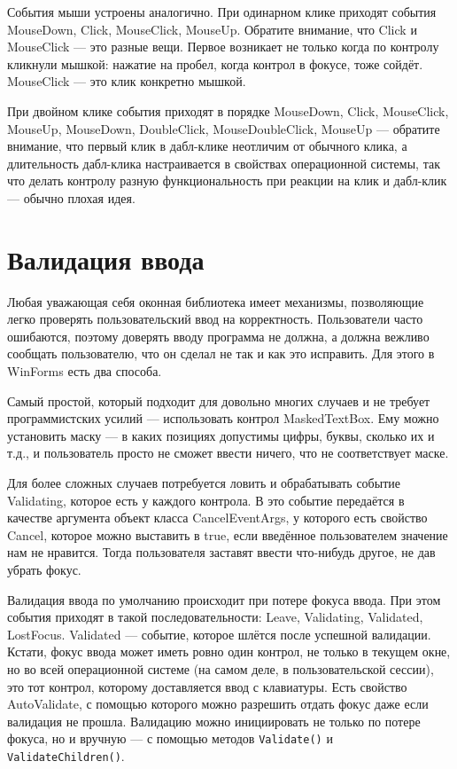 \documentclass{../../text-style}
\begin{document}
События мыши устроены аналогично. При одинарном клике приходят события MouseDown, Click, MouseClick, MouseUp. Обратите внимание, что Click и MouseClick --- это разные вещи. Первое возникает не только когда по контролу кликнули мышкой: нажатие на пробел, когда контрол в фокусе, тоже сойдёт. MouseClick --- это клик конкретно мышкой.

При двойном клике события приходят в порядке MouseDown, Click, MouseClick, MouseUp, MouseDown, DoubleClick, MouseDoubleClick, MouseUp --- обратите внимание, что первый клик в дабл-клике неотличим от обычного клика, а длительность дабл-клика настраивается в свойствах операционной системы, так что делать контролу разную функциональность при реакции на клик и дабл-клик --- обычно плохая идея.

\section{Валидация ввода}

Любая уважающая себя оконная библиотека имеет механизмы, позволяющие легко проверять пользовательский ввод на корректность. Пользователи часто ошибаются, поэтому доверять вводу программа не должна, а должна вежливо сообщать пользователю, что он сделал не так и как это исправить. Для этого в WinForms есть два способа. 

Самый простой, который подходит для  довольно многих случаев и не требует программистских усилий --- использовать контрол MaskedTextBox. Ему можно установить маску --- в каких позициях допустимы цифры, буквы, сколько их  и т.д., и пользователь просто не сможет ввести ничего, что не соответствует маске.

Для более сложных случаев потребуется ловить и обрабатывать событие Validating, которое есть у каждого контрола. В это событие передаётся в качестве аргумента объект класса CancelEventArgs, у которого есть свойство Cancel, которое можно выставить в true, если введённое пользователем значение нам не нравится. Тогда пользователя заставят ввести что-нибудь другое, не дав убрать фокус.

Валидация ввода по умолчанию происходит при потере фокуса ввода. При этом события приходят в такой последовательности:  Leave, Validating, Validated, LostFocus. Validated --- событие, которое шлётся после успешной валидации. Кстати, фокус ввода может иметь ровно один контрол, не только в текущем окне, но во всей операционной системе (на самом деле, в пользовательской сессии), это тот контрол, которому доставляется ввод с клавиатуры. Есть свойство AutoValidate, с помощью которого можно разрешить отдать фокус даже если валидация не прошла. Валидацию можно инициировать не только по потере фокуса, но и вручную --- с помощью методов \texttt{Validate()} и \texttt{ValidateChildren()}.
\end{document}

